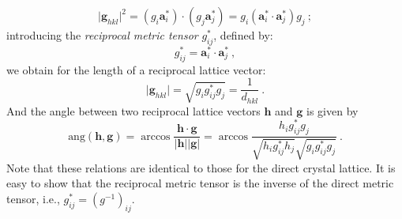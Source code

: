 \[
	\vert\mathbf{g}_{hkl}\vert^2 = (g_i\mathbf{a}^{\ast}_i)\cdot(g_j\mathbf{a}^{\ast}_j) = 
	g_i (\mathbf{a}^{\ast}_i\cdot\mathbf{a}^{\ast}_j) g_j \ ;
\]
introducing the \textit{reciprocal metric tensor} $g^{\ast}_{ij}$, defined by:
\begin{equation}
	g^{\ast}_{ij} = \mathbf{a}^{\ast}_i\cdot\mathbf{a}^{\ast}_j \ ,
\end{equation}
we obtain for the length of a reciprocal lattice vector:
\begin{equation}
	\vert\mathbf{g}_{hkl}\vert = \sqrt{g_i g^{\ast}_{ij}g_j} = \frac{1}{d_{hkl}} \ .\label{eq:recipddef}
\end{equation}
And the angle between two reciprocal lattice  vectors $\mathbf{h}$ and $\mathbf{g}$ is given by
\begin{equation}
	\text{ang}(\mathbf{h},\mathbf{g}) = \arccos\frac{\mathbf{h}\cdot\mathbf{g}}{\vert\mathbf{h}\vert\vert\mathbf{g}\vert} =
	\arccos\frac{h_i g^{\ast}_{ij}g_j}{\sqrt{h_i g^{\ast}_{ij}h_j}\sqrt{g_i g^{\ast}_{ij}g_j}}\ .\label{eq:recipangledef}
\end{equation}
Note that these relations are identical to those for the direct crystal lattice.  It is easy to show that the reciprocal metric tensor is the inverse of the direct metric tensor, i.e., $g^{\ast}_{ij} = (g^{-1})_{ij}$.

